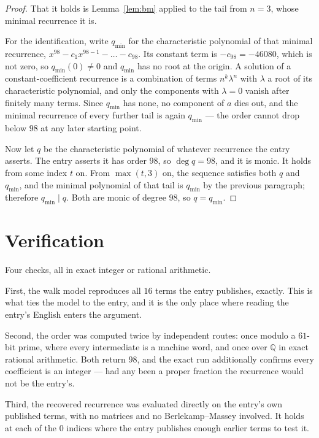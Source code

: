 \documentclass[11pt,a4paper]{article}
\theoremstyle{plain}
\theoremstyle{definition}
\begin{document}
\begin{proof}
That it holds is Lemma~\ref{lem:bm} applied to the tail from $n=3$, whose minimal
recurrence it is.

For the identification, write $q_{\min}$ for the characteristic polynomial of that minimal
recurrence, $x^{98}-c_1x^{98-1}-\dots-c_{98}$. Its constant term is
$-c_{98}=-46080$, which is not zero, so $q_{\min}(0)\neq0$ and $q_{\min}$ has no
root at the origin. A solution of a constant-coefficient recurrence is a combination of terms
$n^{k}\lambda^{n}$ with $\lambda$ a root of its characteristic polynomial, and only the
components with $\lambda=0$ vanish after finitely many terms. Since $q_{\min}$ has none, no
component of $a$ dies out, and the minimal recurrence of every further tail is again
$q_{\min}$ --- the order cannot drop below $98$ at any later starting point.

Now let $q$ be the characteristic polynomial of whatever recurrence the entry asserts. The
entry asserts it has order $98$, so $\deg q=98$, and it is monic. It holds from some
index $t$ on. From $\max(t,3)$ on, the sequence satisfies both $q$ and $q_{\min}$, and
the minimal polynomial of that tail is $q_{\min}$ by the previous paragraph; therefore
$q_{\min}\mid q$. Both are monic of degree $98$, so $q=q_{\min}$.
\end{proof}

\section{Verification}

Four checks, all in exact integer or rational arithmetic.

First, the walk model reproduces all $16$ terms the entry publishes, exactly. This is
what ties the model to the entry, and it is the only place where reading the entry's English
enters the argument.

Second, the order was computed twice by independent routes: once modulo a $61$-bit prime, where
every intermediate is a machine word, and once over $\mathbb{Q}$ in exact rational arithmetic.
Both return $98$, and the exact run additionally confirms every coefficient is an integer
--- had any been a proper fraction the recurrence would not be the entry's.

Third, the recovered recurrence was evaluated directly on the entry's own published terms, with
no matrices and no Berlekamp--Massey involved. It holds at each of the $0$ indices where
the entry publishes enough earlier terms to test it.
\end{document}
